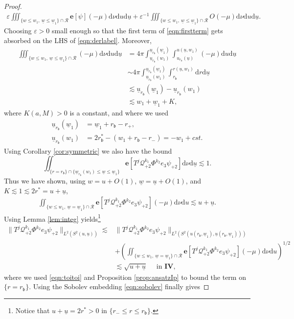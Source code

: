 \documentclass[reqno]{amsart}
\numberwithin{equation}{section}
\newcommand{\quatre}{\mathbf{IV}}
\newcommand{\mcq}{\mathcal{Q}}
\newcommand{\mcr}{\mathcal{R}}
\newcommand{\wbar}{\underline{w}}
\newcommand{\ubar}{{\underline{u}}}
\newcommand{\carterp}{\mcq_{+2}}
\newcommand{\dee}{\mathrm{d}}
\newcommand{\ener}{\mathbf{e}}
\newcommand{\rb}{r_\mathfrak{b}}
\newcommand{\psip}{\psi_{+2}}
\theoremstyle{plain}
\theoremstyle{definition}
\theoremstyle{remark}
\numberwithin{equation}{section}
\begin{document}
\begin{proof}
\begin{align}\label{eqn:firstterm}
    \varepsilon\iiint_{\{w\leq w_1,\:\wbar\leq\wbar_1\}\cap\mcr}\ener[\psi](-\mu)\dee\nu\dee u\dee\ubar+\varepsilon^{-1}\iiint_{\{w\leq w_1,\:\wbar\leq\wbar_1\}\cap\mcr}O(-\mu)\dee\nu\dee u\dee\ubar.
\end{align}
Choosing $\varepsilon>0$ small enough so that the first term of \eqref{eqn:firstterm} gets absorbed on the LHS of \eqref{eqn:derlabel}. Moreover, 
\begin{align*}
    \iiint_{\{w\leq w_1,\:\wbar\leq\wbar_1\}\cap\mcr}(-\mu)\dee\nu\dee u\dee\ubar&=4\pi\int_{\ubar_{\rb}(w_1)}^{\ubar_{\rb}(\wbar_1)}\int_{u_{\rb}(\ubar)}^{u(\ubar,w_1)}(-\mu)\dee u\dee \ubar\\
    &\sim4\pi\int_{\ubar_{\rb}(w_1)}^{\ubar_{\rb}(\wbar_1)}\int_{\rb}^{r(\ubar,w_1)}\dee r\dee \ubar\\
    &\lesssim \ubar_{\rb}(\wbar_1)-\ubar_{\rb}(w_1)\\
    &\lesssim w_1+\wbar_1+K,
\end{align*}
where $K(a,M)>0$ is a constant, and where we used 
\begin{align*}
    \ubar_{\rb}(\wbar_1)&=\wbar_1+\rb-r_+,\\
    \ubar_{\rb}(w_1)&=2\rb^*-(w_1+\rb-r_-)=-w_1+cst.
\end{align*}
Using Corollary \ref{cor:symmetric} we also have the bound 
$$\iint_{\{r=\rb\}\cap\{\wbar_{\rb}(w_1)\leq\wbar\leq\wbar_1\}}\ener[T^j\carterp^{k_1}\Phi^{k_2}e_3\psip]\dee\nu\dee\ubar\lesssim 1.$$
Thus we have shown, { using $w=u+O(1)$, $\wbar=\ubar+O(1)$, and $K\lesssim 1\lesssim 2r^*=u+\ubar$,}
\begin{align}\label{eqn:toitoi}
    \iint_{\{w\leq w_1,\:\wbar=\wbar_1\}\cap\mcr}{\ener}[T^j\carterp^{k_1}\Phi^{k_2}e_3\psip](-\mu)\dee\nu\dee u\lesssim u+\ubar.
\end{align}
Using Lemma \ref{lem:integ} yields\footnote{Notice that $u+\ubar=2r^*>0$ in $\{r_-\leq r\leq\rb\}$.}
\begin{align*}
    \|T^j\carterp^{k_1}\Phi^{k_2}e_3\psip\|_{L^2(S^2(u,\ubar))}\lesssim & \|T^j\carterp^{k_1}\Phi^{k_2}e_3\psip\|_{L^2(S^2(u(\rb,\wbar_1),\ubar(\rb,\wbar_1)))}\\
    &+\left(\iint_{\{w\leq w_1,\:\wbar=\wbar_1\}\cap\mcr}{\ener}[T^j\carterp^{k_1}\Phi^{k_2}e_3\psip](-\mu)\dee\nu\dee u\right)^{1/2}\\
    &\lesssim \sqrt{u+\ubar}\quad\text{   in   }\quatre,
\end{align*}
where we used \eqref{eqn:toitoi} and Proposition \ref{prop:ansatzIp} to bound the term on $\{r=\rb\}$. Using the Sobolev embedding \eqref{eqn:sobolev} finally gives

\end{proof}
\end{document}
